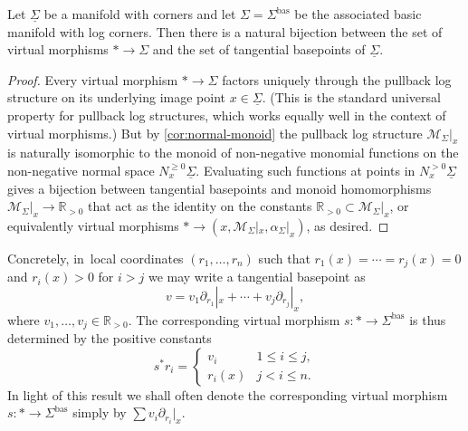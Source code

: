 \documentclass[JEP,XML,SOM,Unicode,NoFloatCountersInSection,published]{cedram}
\theoremstyle{definition}
\theoremstyle{remark}
\newcommand{\RR}{\mathbb{R}}
\renewcommand{\le}{\leqslant}
\renewcommand{\ge}{\geqslant}
\newcommand{\cM}{\mathscr{M}}
\newcommand{\cvf}[1]{\partial_{#1}}
\newcommand{\Sig}{\Sigma}
\newcommand{\uSig}{\underline{\Sigma}}
\newcommand{\bas}[1]{{#1}^{\mathrm{bas}}}
\newcommand{\Sigbas}{\bas{\Sig}}
\begin{document}
\begin{proposition}\label{prop:tangential-basepoints-as-weak-morphisms}
Let $\uSig$ be a manifold with corners and let $\Sig = \Sigbas$ be the associated basic manifold with log corners. Then there is a natural bijection between the set of virtual morphisms $* \to \Sig$ and the set of tangential basepoints of $\uSig$.
\end{proposition}

\begin{proof}
Every virtual morphism $* \to \Sig$ factors uniquely through the pullback log structure on its underlying image point $x \in \uSig$. (This is the standard universal property for pullback log structures, which works equally well in the context of virtual morphisms.) But by \autoref{cor:normal-monoid} the pullback log structure $\cM_{\Sig}|_x$ is naturally isomorphic to the monoid of non-negative monomial functions on the non-negative normal space $N^{\ge0}_x\uSig$. Evaluating such functions at points in $N^{>0}_x \uSig$ gives a bijection between tangential basepoints and monoid homomorphisms $\cM_{\Sig}|_x \to \RR_{>0}$ that act as the identity on the constants $\RR_{>0} \subset \cM_{\Sig}|_x$, or equivalently virtual morphisms $* \to (x,\cM_{\Sig}|_x,\alpha_\Sig|_x)$, as desired.
\end{proof}

Concretely, in~local coordinates $(r_1,\ldots, r_n)$ such that $r_1(x)=\cdots = r_j(x) = 0$ and $r_i(x) > 0$ for $i > j$ we may write a tangential basepoint as
\[
v = v_1 \cvf{r_1}|_x + \cdots + v_j\cvf{r_j}|_x,
\]
where $v_1,\ldots,v_j \in \RR_{>0}$. The corresponding virtual morphism $s\colon * \to \Sigbas$ is thus determined by the positive constants
\[
s^*r_i = \begin{cases}
v_i & 1 \le i \le j, \\
r_i(x) & j < i \le n.
\end{cases}
\]
In light of this result we shall often denote the corresponding virtual morphism $s \colon * \to \Sigbas$ simply by $\sum v_i \cvf{r_i}|_x$.
\end{document}
